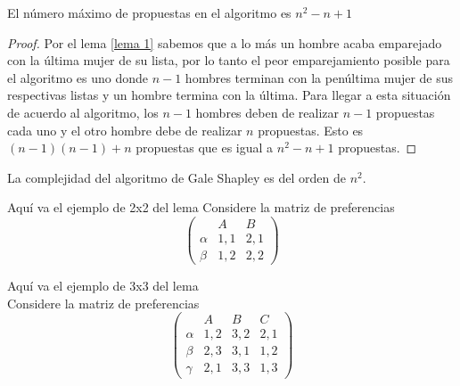 \begin{cor}
El número máximo de propuestas en el algoritmo es $n^2-n+1$
\end{cor}

\begin{proof}
Por el lema \ref{lema 1} sabemos que a lo más un hombre acaba emparejado con la última mujer de su lista, por lo tanto el peor emparejamiento posible para el algoritmo es uno donde $n-1$ hombres terminan con la penúltima mujer de sus respectivas listas y un hombre termina con la última. Para llegar a esta situación de acuerdo al algoritmo, los $n-1$ hombres deben de realizar $n-1$ propuestas cada uno y el otro hombre debe de realizar $n$ propuestas. Esto es $(n-1)(n-1)+n$ propuestas que es igual a $n^2-n+1$ propuestas.
\end{proof}

\begin{obs}
La complejidad del algoritmo de Gale Shapley es del orden de $n^2$.
\end{obs}

\begin{eje}
Aquí va el ejemplo de 2x2 del lema
Considere la matriz de preferencias 
$$\begin{pmatrix}
&A&B\\
\alpha &1,1& 2,1 \\
\beta & 1,2 & 2,2
\end{pmatrix}$$
\end{eje}

\begin{eje}
Aquí va el ejemplo de 3x3 del lema
\\ Considere la matriz de preferencias $$\begin{pmatrix}
& A & B & C \\
\alpha & 1,2 & 3,2 & 2,1 \\
\beta & 2,3 & 3,1 & 1,2 \\
\gamma & 2,1 & 3,3 & 1,3 
\end{pmatrix}$$
\end{eje}



